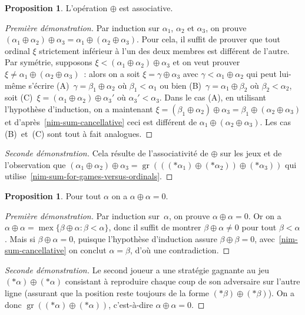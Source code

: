 \documentclass[12pt,a4paper]{article}
\theoremstyle{definition}
\newtheorem{prop}[comcnt]{Proposition}
\newcommand{\mex}{\operatorname{mex}}
\newcommand{\gr}{\operatorname{gr}}
\begin{document}
\begin{prop}\label{nim-sum-associative}
L'opération $\oplus$ est associative.
\end{prop}
\begin{proof}[Première démonstration]
Par induction sur $\alpha_1$, $\alpha_2$ et $\alpha_3$, on prouve
$(\alpha_1\oplus\alpha_2) \oplus \alpha_3 = \alpha_1 \oplus
(\alpha_2\oplus\alpha_3)$.  Pour cela, il suffit de prouver que tout
ordinal $\xi$ strictement inférieur à l'un des deux membres est
différent de l'autre.  Par symétrie, supposons $\xi <
(\alpha_1\oplus\alpha_2) \oplus \alpha_3$ et on veut prouver $\xi \neq
\alpha_1 \oplus (\alpha_2\oplus\alpha_3)$ : alors on a soit $\xi =
\gamma \oplus \alpha_3$ avec $\gamma < \alpha_1\oplus\alpha_2$ qui
peut lui-même s'écrire (A) $\gamma = \beta_1\oplus\alpha_2$ où
$\beta_1<\alpha_1$ ou bien (B) $\gamma = \alpha_1\oplus\beta_2$ où
$\beta_2<\alpha_2$, soit (C) $\xi = (\alpha_1\oplus\alpha_2) \oplus
\alpha_3'$ où $\alpha_3'<\alpha_3$.  Dans le cas (A), en utilisant
l'hypothèse d'induction, on a maintenant $\xi =
(\beta_1\oplus\alpha_2) \oplus \alpha_3 = \beta_1 \oplus
(\alpha_2\oplus\alpha_3)$ et d'après \ref{nim-sum-cancellative} ceci
est différent de $\alpha_1 \oplus (\alpha_2\oplus\alpha_3)$.  Les cas
(B) et (C) sont tout à fait analogues.
\end{proof}
\begin{proof}[Seconde démonstration]
Cela résulte de l'associativité de $\oplus$ sur les jeux et de
l'observation que $(\alpha_1\oplus\alpha_2)\oplus\alpha_3 =
\gr(((*\alpha_1) \oplus (*\alpha_2)) \oplus (*\alpha_3))$ qui
utilise \ref{nim-sum-for-games-versus-ordinals}.
\end{proof}

\begin{prop}\label{nim-sum-has-characteristic-two}
Pour tout $\alpha$ on a $\alpha\oplus\alpha = 0$.
\end{prop}
\begin{proof}[Première démonstration]
Par induction sur $\alpha$, on prouve $\alpha\oplus\alpha = 0$.  Or on
a $\alpha\oplus\alpha = \mex\{\beta\oplus\alpha:\beta<\alpha\}$, donc
il suffit de montrer $\beta\oplus\alpha \neq 0$ pour tout
$\beta<\alpha$.  Mais si $\beta\oplus\alpha = 0$, puisque l'hypothèse
d'induction assure $\beta\oplus\beta = 0$,
avec \ref{nim-sum-cancellative} on conclut $\alpha=\beta$, d'où une
contradiction.
\end{proof}
\begin{proof}[Seconde démonstration]
Le second joueur a une stratégie gagnante au jeu
$(*\alpha)\oplus(*\alpha)$ consistant à reproduire chaque coup de son
adversaire sur l'autre ligne (assurant que la position reste toujours
de la forme $(*\beta)\oplus(*\beta)$).  On a donc
$\gr((*\alpha)\oplus(*\alpha))$, c'est-à-dire $\alpha \oplus \alpha =
0$.
\end{proof}
\end{document}

